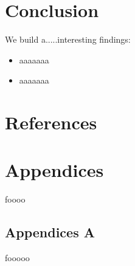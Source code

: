 \documentclass[13pt]{ctexart} %
\begin{document}
\section{Conclusion}
We build a.....interesting findings:

\begin{itemize}
    \item aaaaaaa
    \item aaaaaaa
\end{itemize}

\newpage
\section*{References}
\fancyhf{}
\fancyhead[R]{ }
\fancyhead[L]{ }

\Large

\newpage

\section*{Appendices}
\fontsize{13pt}{12.5pt}\selectfont
foooo
\vspace{7pt}
\subsection*{Appendices A}
fooooo
\end{document}
